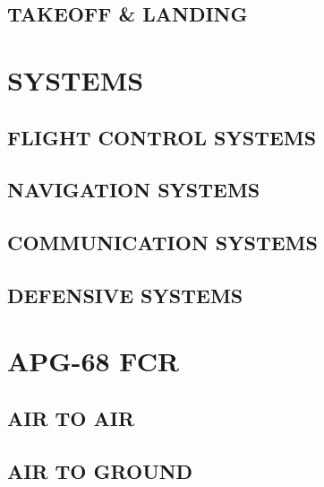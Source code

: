 \documentclass[fontInter]{TechCheck}
\begin{document}
	\clearpage
	
	\section{TAKEOFF \& LANDING}

	

	\cleardoublepage

	\chapter{SYSTEMS}
	\minitoc
	\cleardoublepage

	\section{FLIGHT CONTROL SYSTEMS}

	\clearpage

	\section{NAVIGATION SYSTEMS}

	\clearpage

	\section{COMMUNICATION SYSTEMS}

	\clearpage
	
	\section{DEFENSIVE SYSTEMS}

	\clearpage

	\cleardoublepage

	\chapter{APG-68 FCR}
	\minitoc
	\cleardoublepage

	\section{AIR TO AIR}

	\clearpage 

	\section{AIR TO GROUND}
\end{document}
